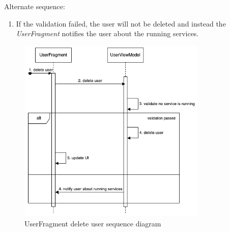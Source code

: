 Alternate sequence:
\begin{enumerate}[start=4]
    \item If the validation failed, the user will not be deleted and instead the \emph{UserFragment} notifies the user about the running services.
\end{enumerate}


\begin{figure}[H]
    \centering
    \includegraphics[width=0.8\textwidth]{diagrams/delete-user-frag-seq.drawio.png}
    \caption{UserFragment delete user sequence diagram}
    \label{fig:userfragment_delete_user}
\end{figure}